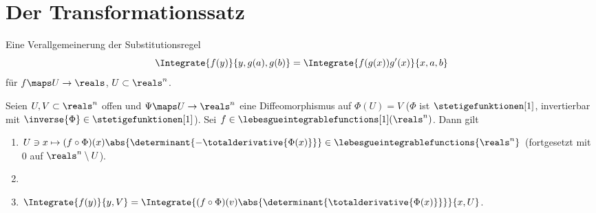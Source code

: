 \section{Der Transformationssatz}
\begin{ziel*}
  Eine Verallgemeinerung der Substitutionsregel
  \begin{equation*}
    \Integrate{f(y)}{y,g(a),g(b)}=\Integrate{f(g(x))g'(x)}{x,a,b}
  \end{equation*}
  für \( f\maps U\to \reals \), \( U\subset \reals^n \).
\end{ziel*}
\begin{satz}[Transformationssatz]\label{transformationssatz}
  Seien \( U,V\subset \reals^n \) offen und \( \Psi\maps U\to \reals^n \) eine Diffeomorphismus auf \( \Phi(U)=V \) (\dh \( \Phi \) ist \( \stetigefunktionen[1] \), invertierbar mit \( \inverse{\Phi}\in \stetigefunktionen[1] \)). Sei \( f\in \lebesgueintegrablefunctions[1](\reals^n) \). Dann gilt
  \begin{enumerate}
    \item \( U\ni x\mapsto (f\circ \Phi)(x)\abs{\determinant{-{\totalderivative{\Phi(x)}}}}\in \lebesgueintegrablefunctions{\reals^n} \) (fortgesetzt mit \( 0 \) auf \( \reals^n\setminus U \)).
    \item \item \( \Integrate{f(y)}{y,V}=\Integrate{(f\circ \Phi)(v)\abs{\determinant{\totalderivative{\Phi(x)}}}}{x,U} \).
  \end{enumerate}
\end{satz}
